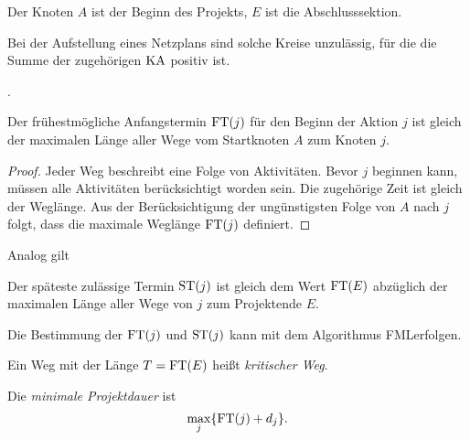 Der Knoten $A$ ist der Beginn des Projekts, $E$ ist die Abschlusssektion.

\begin{lem}
  Bei der Aufstellung eines Netzplans sind solche Kreise unzulässig, für die die
  Summe der zugehörigen $\operatorname*{KA}$ positiv ist.
\end{lem}

\begin{exmp}
  .
\end{exmp}

\begin{aus}
  Der frühestmögliche Anfangstermin $\operatorname*{FT}(j)$ für den Beginn der Aktion $j$ ist
  gleich der maximalen Länge aller Wege vom Startknoten $A$ zum Knoten $j$.
\end{aus}

\begin{proof}
  Jeder Weg beschreibt eine Folge von Aktivitäten. Bevor $j$ beginnen kann,
  müssen alle Aktivitäten berücksichtigt worden sein. Die zugehörige Zeit ist
  gleich der Weglänge. Aus der Berücksichtigung der ungünstigsten Folge von $A$
  nach $j$ folgt, dass die maximale Weglänge $\operatorname*{FT}(j)$ definiert.
\end{proof}

Analog gilt
\begin{aus}
  Der späteste zulässige Termin $\operatorname*{ST}(j)$ ist gleich dem Wert $\operatorname*{FT}(E)$ abzüglich
  der maximalen Länge aller Wege von $j$ zum Projektende $E$.
\end{aus}

\begin{flg}
  Die Bestimmung der $\operatorname*{FT}(j)$ und $\operatorname*{ST}(j)$ kann mit dem Algorithmus
  FML\footnotemark erfolgen.
\end{flg}

Ein Weg mit der Länge $T = \operatorname*{FT}(E)$ heißt \emph{kritischer Weg}.

Die \emph{minimale Projektdauer} ist
\[ \max_j \{ \operatorname*{FT}(j) + d_j \}. \]

